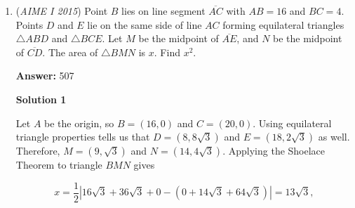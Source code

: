\begin{enumerate}
 $17^3=16p+1$, yielding $p=\boxed{307}$, which is prime.

 
-among us (countmath1)

 



\textbf{Solution 10 (Lengthy Brute Force)}

Recognizing that AIME answers are $0$ through $999$, the numbers whose cube could even be in contention to be equal to $16p + 1$ are $4-25$. The cubes of $1-3$ are all below $17$. We might consider $1$, but that would result in a $p$ of $0$, which is not prime and does not follow our given conditions. We can also see that $16p + 1$ must be an odd number. Hence, we brute force by looking at all cubes of odd numbers in $5-25$ until we get that the cube of $17$, $4913$, works when $p=\boxed{307}$

 Solution by: armang32324

 



\textbf{Solution 11 (Similar to Solution 7, See Last Part)}

What if we say our perfect cube is $x^3$? Then when we solve for $p$, we get:
 \[\]$16p+1=x^3$, so then $x^3\equiv1\mod 16$.
 \[\]Therefore, $x\equiv1\mod 16$. Let's now test values!
 \[\]If $x=1 \Rightarrow p=0$.
 \[\]If $x=17 \Rightarrow 17^3-1=(17-1)(17^2+17+1)=(16)(307)$. 307 is prime! Therefore, $p$ is $\boxed{307}$.
 \[\]~Namish Dour

 


	\item (\textit{AIME I 2015}) Point $B$ lies on line segment $\overline{AC}$ with $AB=16$ and $BC=4$. Points $D$ and $E$ lie on the same side of line $AC$ forming equilateral triangles $\triangle ABD$ and $\triangle BCE$. Let $M$ be the midpoint of $\overline{AE}$, and $N$ be the midpoint of $\overline{CD}$. The area of $\triangle BMN$ is $x$. Find $x^2$.


 



 
 \textbf{Answer: }507



\textbf{Solution 1}

Let $A$ be the origin, so $B=(16,0)$ and $C=(20,0).$ Using equilateral triangle properties tells us that $D=(8,8\sqrt3)$ and $E=(18,2\sqrt3)$ as well. Therefore, $M=(9,\sqrt3)$ and $N=(14,4\sqrt3).$ Applying the Shoelace Theorem to triangle $BMN$ gives

 
 \[x=\dfrac 1 2 |16\sqrt3+36\sqrt3+0-(0+14\sqrt3+64\sqrt3)| =13\sqrt3,\]


\end{enumerate}
